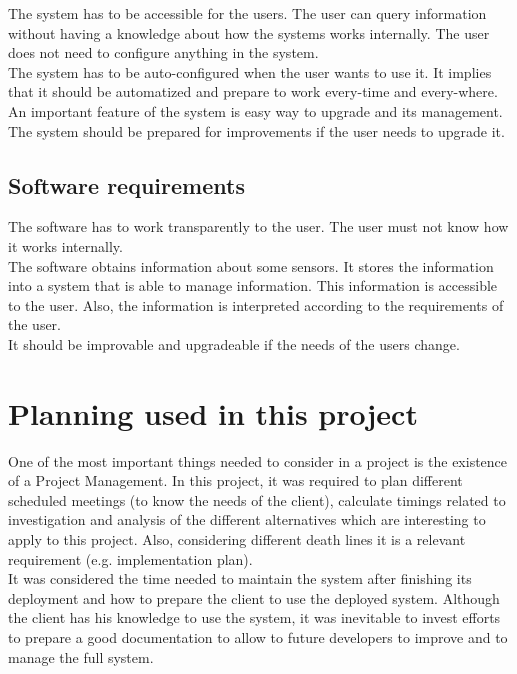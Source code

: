 The system has to be accessible for the users. The user can query information without having a knowledge about how the systems works internally. The user does not need to configure anything in the system.\\

The system has to be auto-configured when the user wants to use it. It implies that it should be automatized and prepare to work every-time and every-where.\\

An important feature of the system is easy way to upgrade and its management. The system should be prepared for improvements if the user needs to upgrade it.

\subsection{Software requirements}

The software has to work transparently to the user. The user must not know how it works internally.\\

The software obtains information about some sensors. It stores the information into a system that is able to manage information. This information is accessible to the user. Also, the information is interpreted according to the requirements of the user.\\

It should be improvable and upgradeable if the needs of the users change.

\section{Planning used in this project}

One of the most important things needed to consider in a project is the existence of a Project Management. In this project, it was required to plan different scheduled meetings (to know the needs of the client), calculate timings related to investigation and analysis of the different alternatives which are interesting to apply to this project. Also, considering different death lines it is a relevant requirement (e.g. implementation plan).\\

It was considered the time needed to maintain the system after finishing its deployment and how to prepare the client to use the deployed system. Although the client has his knowledge to use the system, it was inevitable to invest efforts to prepare a good documentation to allow to future developers to improve and to manage the full system.\\

